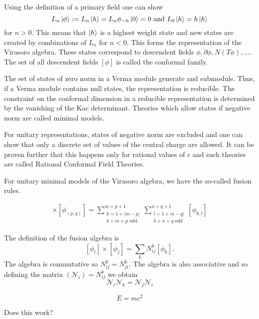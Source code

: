 \documentclass{article}
\begin{document}
Using the definition of a primary field one can show $$L_n\ket{\phi}:=L_n\ket{h}=L_n\phi_{-h}\ket{0}=0 \text{ and } L_0\ket{h}=h\ket{h}$$ for $n>0$. This means that $\ket{h}$ is a highest weight state and new states are created by combinations of $L_n$ for $n<0$. This forms the representation of the Virasoro algebra. These states correspond to descendent fields $\phi, \partial\phi, N(T\phi), \dots$. The set of all descendent fields $[\phi]$ is called the conformal family. 

The set of states of zero norm in a Verma module generate and submodule. Thus, if a Verma module contains null states, the representation is reducible. The constraint on the conformal dimension in a reducible representation is determined by the vanishing of the Kac determinant. Theories which allow states if negative norm are called minimal models. 

For unitary representations, states of negative norm are excluded and one can show that only a discrete set of values of the central charge are allowed. It can be proven further that this happens only for rational values of $c$ and such theories are called Rational Conformal Field Theories.  

For unitary minimal models of the Virasoro algebra, we have the so-called fusion rules.

\begin{align*}
    [\phi_{(m,n)}] \times [\phi_{(p,q)}]=\sum_{\substack{k=1+|m-p|\\k+m+p \text{ odd}}}^{m+p+1}\sum_{\substack{l=1+|n-q|\\k+n+q \text{ odd}}}^{n+q+1}[\phi_{k,l}]
\end{align*}

The definition of the fusion algebra is $$[\phi_i] \times [\phi_j]=\sum_kN^k_{ij}[\phi_k].$$ The algebra is commutative so $N^k_{ij}=N^k_{ji}$. The algebra is also associative and so defining the matrix $(\mathcal{N}_i)=N^k_{ij}$ we obtain $$\mathcal{N}_i\mathcal{N}_k=\mathcal{N}_j\mathcal{N}_i$$


\begin{displaymath}
	E = mc^{2}
\end{displaymath}

Does this work?
\end{document}
